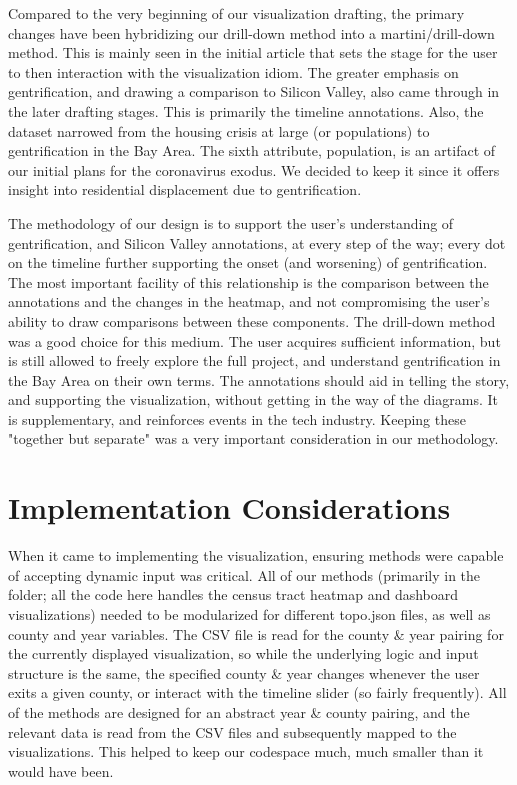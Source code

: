 \documentclass{article}
\begin{document}
    Compared to the very beginning of our visualization drafting, the primary changes have been hybridizing our drill-down method into a martini/drill-down method. This is mainly seen in the initial article that sets the stage for the user to then interaction with the visualization idiom. The greater emphasis on gentrification, and drawing a comparison to Silicon Valley, also came through in the later drafting stages. This is primarily the timeline annotations. Also, the dataset narrowed from the housing crisis at large (or populations) to gentrification in the Bay Area. The sixth attribute, population, is an artifact of our initial plans for the coronavirus exodus. We decided to keep it since it offers insight into residential displacement due to gentrification. 
    
    The methodology of our design is to support the user's understanding of gentrification, and Silicon Valley annotations, at every step of the way; every dot on the timeline further supporting the onset (and worsening) of gentrification. The most important facility of this relationship is the comparison between the annotations and the changes in the heatmap, and not compromising the user's ability to draw comparisons between these components. The drill-down method was a good choice for this medium. The user acquires sufficient information, but is still allowed to freely explore the full project, and understand gentrification in the Bay Area on their own terms. The annotations should aid in telling the story, and supporting the visualization, without getting in the way of the diagrams. It is supplementary, and reinforces events in the tech industry. Keeping these "together but separate" was a very important consideration in our methodology.
    
\section{Implementation Considerations} \label{impl}

    When it came to implementing the visualization, ensuring methods were capable of accepting dynamic input was critical. All of our methods (primarily in the  folder; all the code here handles the census tract heatmap and dashboard visualizations) needed to be modularized for different topo.json files, as well as county and year variables. The CSV file is read for the county \& year pairing for the currently displayed visualization, so while the underlying logic and input structure is the same, the specified county \& year changes whenever the user exits a given county, or interact with the timeline slider (so fairly frequently). All of the methods are designed for an abstract year \& county pairing, and the relevant data is read from the CSV files and subsequently mapped to the visualizations. This helped to keep our codespace much, much smaller than it would have been.
    
\end{document}
